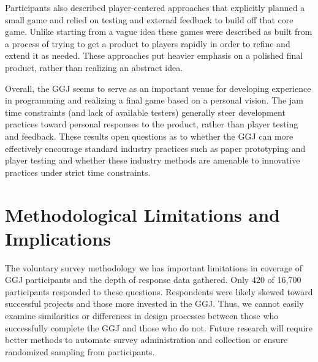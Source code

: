 \documentclass{sig-alternate}
\begin{document}
Participants also described player-centered approaches that explicitly planned a small game and relied on testing and external feedback to build off that core game. Unlike starting from a vague idea these games were described as built from a process of trying to get a product to players rapidly in order to refine and extend it as needed. These approaches put heavier emphasis on a polished final product, rather than realizing an abstract idea.

Overall, the GGJ seems to serve as an important venue for developing experience in programming and realizing a final game based on a personal vision. The jam time constraints (and lack of available testers) generally steer development practices toward personal responses to the product, rather than player testing and feedback. These results open questions as to whether the GGJ can more effectively encourage standard industry practices such as paper prototyping and player testing and whether these industry methods are amenable to innovative practices under strict time constraints.





\section{Methodological Limitations and Implications}
The voluntary survey methodology we has important limitations in coverage of GGJ participants and the depth of response data gathered. Only 420 of 16,700 participants responded to these questions. Respondents were likely skewed toward successful projects and those more invested in the GGJ. Thus, we cannot easily examine similarities or differences in design processes between those who successfully complete the GGJ and those who do not. Future research will require better methods to automate survey administration and collection or ensure randomized sampling from participants.
\end{document}
